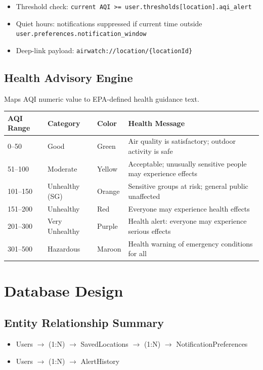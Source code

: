 \documentclass[12pt]{article}
\begin{document}
\begin{itemize}
    \item Threshold check: \texttt{current AQI >= user.thresholds[location].aqi\_alert}
    \item Quiet hours: notifications suppressed if current time outside \texttt{user.preferences.notification\_window}
    \item Deep-link payload: \texttt{airwatch://location/\{locationId\}}
\end{itemize}

\subsection{Health Advisory Engine}
Maps AQI numeric value to EPA-defined health guidance text.

\begin{center}
\begin{longtable}{|p{2.5cm}|p{3cm}|p{2cm}|p{6cm}|}
\hline
\textbf{AQI Range} & \textbf{Category} & \textbf{Color} & \textbf{Health Message} \\
\hline
0--50 & Good & Green & Air quality is satisfactory; outdoor activity is safe \\
\hline
51--100 & Moderate & Yellow & Acceptable; unusually sensitive people may experience effects \\
\hline
101--150 & Unhealthy (SG) & Orange & Sensitive groups at risk; general public unaffected \\
\hline
151--200 & Unhealthy & Red & Everyone may experience health effects \\
\hline
201--300 & Very Unhealthy & Purple & Health alert: everyone may experience serious effects \\
\hline
301--500 & Hazardous & Maroon & Health warning of emergency conditions for all \\
\hline
\end{longtable}
\end{center}

\section{Database Design}

\subsection{Entity Relationship Summary}
\begin{itemize}
    \item Users $\rightarrow$ (1:N) $\rightarrow$ SavedLocations $\rightarrow$ (1:N) $\rightarrow$ NotificationPreferences
    \item Users $\rightarrow$ (1:N) $\rightarrow$ AlertHistory
\end{itemize}
\end{document}
